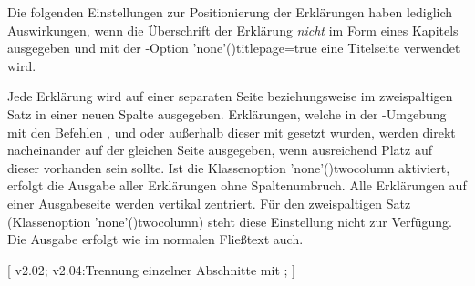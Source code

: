 \begin{DeclareEntity*}{}
\begin{DeclareEntity*}{}
\begin{DeclareEntity*}{}
\begin{Declaration}
Die folgenden Einstellungen zur Positionierung der Erklärungen haben lediglich 
Auswirkungen, wenn die Überschrift der Erklärung \emph{nicht} im Form eines 
Kapitels ausgegeben und mit der \KOMAScript-Option 
\Option'none'(){titlepage=true} eine Titelseite verwendet 
wird.
\begin{DeclareValues}{}
  Jede Erklärung wird auf einer separaten Seite
  beziehungsweise im zweispaltigen Satz in einer neuen Spalte ausgegeben.
  Erklärungen, welche in der -Umgebung mit den 
  Befehlen ,  und  oder 
  außerhalb dieser mit  gesetzt wurden, werden direkt 
  nacheinander auf der gleichen Seite ausgegeben, wenn ausreichend Platz auf 
  dieser vorhanden sein sollte. Ist die Klassenoption 
  \Option'none'(){twocolumn} aktiviert, erfolgt die Ausgabe 
  aller Erklärungen ohne Spaltenumbruch.
  Alle Erklärungen auf einer Ausgabeseite werden vertikal zentriert. Für 
  den zweispaltigen Satz 
  (Klassenoption \Option'none'(){twocolumn}) steht diese 
  Einstellung nicht zur Verfügung.
  Die Ausgabe erfolgt wie im normalen Fließtext auch.
\end{DeclareValues}
\end{Declaration}

\begin{Declaration}
  {}
[%
  v2.02;%
  v2.04:Trennung einzelner Abschnitte mit ;%
]
\begin{Declaration}
  {}
\begin{Declaration}
  {}
\begin{Declaration}
  {}
\begin{Declaration}
  {}
\begin{Declaration}
  {}
\begin{Declaration}
  {}
\begin{Declaration}
  {}
\begin{Declaration}
  {}
\begin{Declaration}
  {}
\begin{Declaration}
  {}
\printdeclarationlist


\end{Declaration}
\end{Declaration}
\end{Declaration}
\end{Declaration}
\end{Declaration}
\end{Declaration}
\end{Declaration}
\end{Declaration}
\end{Declaration}
\end{Declaration}
\end{Declaration}
\end{DeclareEntity*}
\end{DeclareEntity*}
\end{DeclareEntity*}
